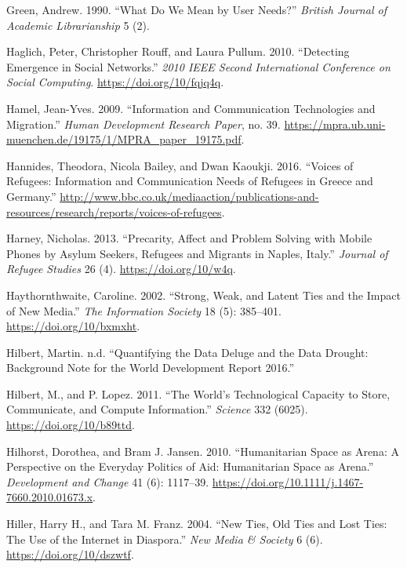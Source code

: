 \documentclass[
]{article}
\newlength{\cslhangindent}
\newenvironment{cslreferences}%
  {\setlength{\parindent}{0pt}%
  \everypar{\setlength{\hangindent}{\cslhangindent}}\ignorespaces}%
  {\par}
\begin{document}
\begin{cslreferences}
\leavevmode\hypertarget{ref-Green1990What}{}%
Green, Andrew. 1990. ``What Do We Mean by User Needs?'' \emph{British
Journal of Academic Librarianship} 5 (2).

\leavevmode\hypertarget{ref-Haglich2010Detecting}{}%
Haglich, Peter, Christopher Rouff, and Laura Pullum. 2010. ``Detecting
Emergence in Social Networks.'' \emph{2010 IEEE Second International
Conference on Social Computing}. \url{https://doi.org/10/fqjq4q}.

\leavevmode\hypertarget{ref-Hamel2009Information}{}%
Hamel, Jean-Yves. 2009. ``Information and Communication Technologies and
Migration.'' \emph{Human Development Research Paper}, no. 39.
\url{https://mpra.ub.uni-muenchen.de/19175/1/MPRA_paper_19175.pdf}.

\leavevmode\hypertarget{ref-Hannides2016Voices}{}%
Hannides, Theodora, Nicola Bailey, and Dwan Kaoukji. 2016. ``Voices of
Refugees: Information and Communication Needs of Refugees in Greece and
Germany.''
\url{http://www.bbc.co.uk/mediaaction/publications-and-resources/research/reports/voices-of-refugees}.

\leavevmode\hypertarget{ref-Harney2013Precarity}{}%
Harney, Nicholas. 2013. ``Precarity, Affect and Problem Solving with
Mobile Phones by Asylum Seekers, Refugees and Migrants in Naples,
Italy.'' \emph{Journal of Refugee Studies} 26 (4).
\url{https://doi.org/10/w4q}.

\leavevmode\hypertarget{ref-Haythornthwaite2002Strong}{}%
Haythornthwaite, Caroline. 2002. ``Strong, Weak, and Latent Ties and the
Impact of New Media.'' \emph{The Information Society} 18 (5): 385--401.
\url{https://doi.org/10/bxmxht}.

\leavevmode\hypertarget{ref-HilbertQuantifying}{}%
Hilbert, Martin. n.d. ``Quantifying the Data Deluge and the Data
Drought: Background Note for the World Development Report 2016.''

\leavevmode\hypertarget{ref-Hilbert2011Worlds}{}%
Hilbert, M., and P. Lopez. 2011. ``The World's Technological Capacity to
Store, Communicate, and Compute Information.'' \emph{Science} 332
(6025). \url{https://doi.org/10/b89ttd}.

\leavevmode\hypertarget{ref-Hilhorst2010Humanitarian}{}%
Hilhorst, Dorothea, and Bram J. Jansen. 2010. ``Humanitarian Space as
Arena: A Perspective on the Everyday Politics of Aid: Humanitarian Space
as Arena.'' \emph{Development and Change} 41 (6): 1117--39.
\url{https://doi.org/10.1111/j.1467-7660.2010.01673.x}.

\leavevmode\hypertarget{ref-Hiller2004New}{}%
Hiller, Harry H., and Tara M. Franz. 2004. ``New Ties, Old Ties and Lost
Ties: The Use of the Internet in Diaspora.'' \emph{New Media \& Society}
6 (6). \url{https://doi.org/10/dszwtf}.


\end{cslreferences}
\end{document}
